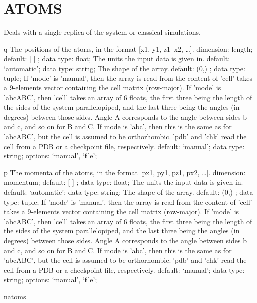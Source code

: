 \section{ATOMS}
\label{ATOMS}
\begin{ipifield}{}%
{Deals with a single replica of the system or classical simulations.}%
{}%
{}
\begin{ipifield}{q}%
{The positions of the atoms, in the format [x1, y1, z1, x2, \ldots  ].}%
{dimension: length; default:  [ ] ; data type: float; }%
{%
{The units the input data is given in.}%
{default: `automatic'; data type: string; }%
%
{The shape of the array.}%
{default:  (0,) ; data type: tuple; }%
%
{If 'mode' is 'manual', then the array is read from the content of 'cell' takes a 9-elements vector containing the cell matrix (row-major). If 'mode' is 'abcABC', then 'cell' takes an array of 6 floats, the first three being the length of the sides of the system parallelopiped, and the last three being the angles (in degrees) between those sides. Angle A corresponds to the angle between sides b and c, and so on for B and C. If mode is 'abc', then this is the same as for 'abcABC', but the cell is assumed to be orthorhombic. 'pdb' and 'chk' read the cell from a PDB or a checkpoint file, respectively.}%
{default: `manual'; data type: string; options: `manual', `file'; }%
}
\end{ipifield}
\begin{ipifield}{p}%
{The momenta of the atoms, in the format [px1, py1, pz1, px2, \ldots  ].}%
{dimension: momentum; default:  [ ] ; data type: float; }%
{%
{The units the input data is given in.}%
{default: `automatic'; data type: string; }%
%
{The shape of the array.}%
{default:  (0,) ; data type: tuple; }%
%
{If 'mode' is 'manual', then the array is read from the content of 'cell' takes a 9-elements vector containing the cell matrix (row-major). If 'mode' is 'abcABC', then 'cell' takes an array of 6 floats, the first three being the length of the sides of the system parallelopiped, and the last three being the angles (in degrees) between those sides. Angle A corresponds to the angle between sides b and c, and so on for B and C. If mode is 'abc', then this is the same as for 'abcABC', but the cell is assumed to be orthorhombic. 'pdb' and 'chk' read the cell from a PDB or a checkpoint file, respectively.}%
{default: `manual'; data type: string; options: `manual', `file'; }%
}
\end{ipifield}
\begin{ipifield}{natoms}%

\end{ipifield}
\end{ipifield}

